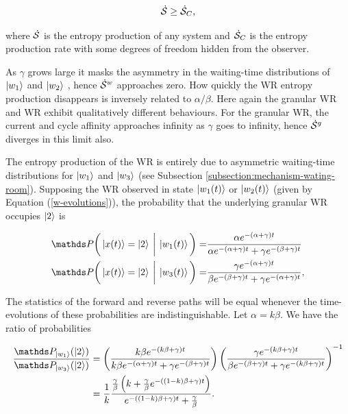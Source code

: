 \begin{align}\label{coarse-grained-inequality}
\dot{\mathcal{S}} \geq \dot{\mathcal{S}}_C,
\end{align}

where $\dot{\mathcal{S}}$ is the entropy production of any system and $\dot{\mathcal{S}}_C$ is the entropy production rate with some degrees of freedom hidden from the observer. 

As $\gamma$ grows large it masks the asymmetry in the waiting-time distributions of $\ket{w_1}$ and $\ket{w_2}$ , hence $\dot{\mathcal{S}}^w$ approaches zero. How quickly the WR entropy production disappears is inversely related to  $\alpha/\beta$. Here again the granular WR and WR exhibit qualitatively different behaviours. For the granular WR, the current and cycle affinity approaches infinity as $\gamma$ goes to infinity, hence $\dot{\mathcal{S}}^g$ diverges in this limit also. 

The entropy production of the WR is entirely due to asymmetric waiting-time distributions for $\ket{w_1}$ and $\ket{w_3}$ (see Subsection \ref{subsection:mechanism-wating-room}).  Supposing the WR observed in state $\ket{w_1(t)}$ or $\ket{w_2(t)}$ (given by Equation (\ref{w-evolutions})), the probability that the underlying granular WR occupies $\ket{2}$ is

\begin{align}
\bP\bigg( \ket{x(t)} = \ket{2} \: \bigg\lvert \: \ket{w_1(t)}\bigg) =& \frac{\alpha e^{-(\alpha + \gamma)t} }{\alpha e^{-(\alpha + \gamma)t}+ \gamma e^{-(\beta + \gamma)t}} \\ 
\bP\bigg( \ket{x(t)} = \ket{2} \: \bigg\lvert \: \ket{w_3(t)}\bigg) =& \frac{\gamma e^{-(\alpha + \gamma)t}}{\beta e^{-(\beta + \gamma)t} + \gamma e^{-(\alpha +\gamma)t}},
\end{align}

The statistics of the forward and reverse paths will be equal whenever the time-evolutions of these probabilities are indistinguishable. Let $\alpha = k\beta$. We have the ratio of probabilities 

\begin{align}\label{time-evolution-ratio}
\begin{split} 
\frac{\bP_{\ket{w_1}}(\ket{2})}{\bP_{\ket{w_3}}(\ket{2})} &= \left(\frac{k\beta e^{-(k\beta + \gamma)t} }{k\beta e^{-(\alpha + \gamma)t}+ \gamma e^{-(\beta + \gamma)t}}\right)\left(\frac{\gamma e^{-(k\beta + \gamma)t}}{\beta e^{-(\beta + \gamma)t} + \gamma e^{-(k\beta +\gamma)t}}\right)^{-1} \\
&= \frac{1}{k}\frac{\frac{\gamma}{\beta} \left(k + \frac{\gamma}{\beta} e^{-((1-k)\beta +\gamma)t}\right)}{e^{-((1-k)\beta +\gamma)t} + \frac{\gamma}{\beta}}.
\end{split}
\end{align}

